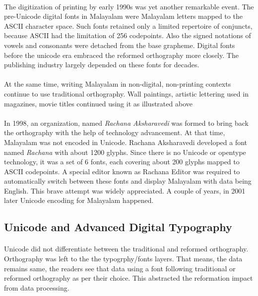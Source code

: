 \documentclass[10pt]{article}
\begin{document}
\paragraph{}
The digitization of printing by early 1990s was yet another remarkable event. The pre-Unicode digital fonts in Malayalam were Malayalam letters mapped to the ASCII character space. Such fonts retained only a limited repertoire of conjuncts, because ASCII had the limitation of 256 codepoints. Also the signed notations of vowels and consonants were detached from the base grapheme. Digital fonts before the unicode era embraced the reformed orthography more closely. The publishing industry largely depended on these fonts for decades.

\paragraph{}
At the same time, writing Malayalam in non-digital, non-printing contexts continue to use traditional orthography. Wall paintings, artistic lettering used in magazines, movie titles continued using it as illustrated above

\paragraph{}
In 1998, an organization, named \textit{Rachana Aksharavedi} was formed to bring back the orthography with the help of technology advancement. At that time, Malayalam was not encoded in Unicode. Rachana Aksharavedi developed a font named \textit{Rachana} with about 1200 glyphs. Since there is no Unicode or opentype technology, it was a set of 6 fonts, each covering about 200 glyphs mapped to ASCII codepoints. A special editor known as Rachana Editor was required to automatically switch between these fonts and display Malayalam with data being English. This brave attempt was widely appreciated. A couple of years, in 2001 later Unicode encoding for Malayalam happened.

\subsection{Unicode and Advanced Digital Typography}

\paragraph{}
Unicode did not differentiate between the traditional and reformed orthography. Orthography was left to the the typogrphy/fonts layers. That means, the data remains same, the readers see that data using a font following traditional or reformed orthography as per their choice. This abstracted the reformation impact from data processing.
\end{document}
